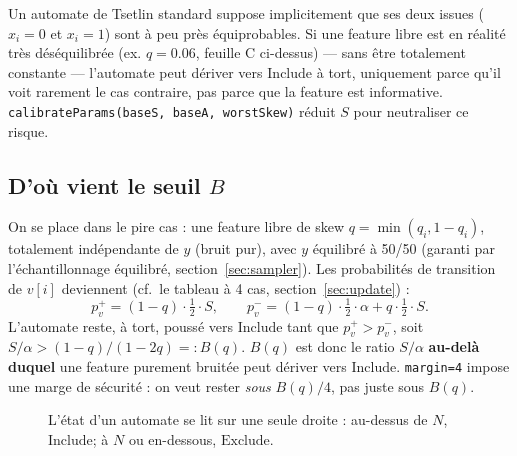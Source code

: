 \documentclass[12pt,a4paper]{article}
\newcommand{\Inc}{\ensuremath{\mathrm{Include}}}
\newcommand{\Exc}{\ensuremath{\mathrm{Exclude}}}
\newcommand{\code}[1]{\texttt{#1}}
\theoremstyle{remark}
\begin{document}
Un automate de Tsetlin standard suppose implicitement que ses deux issues
($x_i{=}0$ et $x_i{=}1$) sont à peu près équiprobables. Si une feature libre est
en réalité très déséquilibrée (ex. $q=0.06$, feuille C ci-dessus) --- sans être
totalement constante --- l'automate peut dériver vers $\Inc$ à tort, uniquement
parce qu'il voit rarement le cas contraire, pas parce que la feature est
informative. \code{calibrateParams(baseS, baseA, worstSkew)} réduit $S$ pour
neutraliser ce risque.

\subsection{D'où vient le seuil $B$}

On se place dans le pire cas : une feature libre de skew $q=\min(q_i,1-q_i)$,
totalement indépendante de $y$ (bruit pur), avec $y$ équilibré à 50/50 (garanti
par l'échantillonnage équilibré, section~\ref{sec:sampler}). Les probabilités de
transition de $v[i]$ deviennent (cf.\ le tableau à 4 cas, section~\ref{sec:update}) :
\[
  p^+_v = (1-q)\cdot\tfrac12\cdot S, \qquad
  p^-_v = (1-q)\cdot\tfrac12\cdot\alpha + q\cdot\tfrac12\cdot S.
\]
L'automate reste, à tort, poussé vers $\Inc$ tant que $p^+_v > p^-_v$, soit
$S/\alpha > (1-q)/(1-2q) =: B(q)$. $B(q)$ est donc le ratio $S/\alpha$
\textbf{au-delà duquel} une feature purement bruitée peut dériver vers $\Inc$.
\code{margin=4} impose une marge de sécurité : on veut rester \emph{sous}
$B(q)/4$, pas juste sous $B(q)$.

\begin{figure}[h]
\centering
{}
\caption{L'état d'un automate se lit sur une seule droite : au-dessus de $N$,
\Inc ; à $N$ ou en-dessous, \Exc.}
\label{fig:automate-line}
\end{figure}
\end{document}
